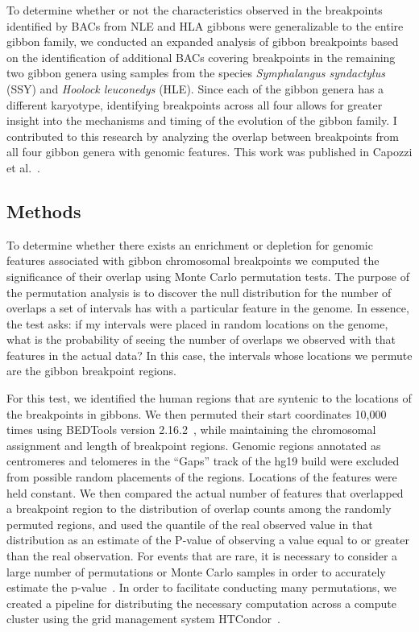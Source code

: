 To determine whether or not the characteristics observed in the breakpoints identified by BACs from NLE and HLA gibbons were generalizable to the entire gibbon family, we conducted an expanded analysis of gibbon breakpoints based on the identification of additional BACs covering breakpoints in the remaining two gibbon genera using samples from the species \emph{Symphalangus syndactylus} (SSY) and \emph{Hoolock leuconedys} (HLE). Since each of the gibbon genera has a different karyotype, identifying breakpoints across all four allows for greater insight into the mechanisms and timing of the evolution of the gibbon family. I contributed to this research by analyzing the overlap between breakpoints from all four gibbon genera with genomic features. This work was published in Capozzi et al.~\cite{Capozzi:2012bb}.

\subsection{Methods}

To determine whether there exists an enrichment or depletion for genomic features associated with gibbon chromosomal breakpoints we computed the significance of their overlap using Monte Carlo permutation tests. The purpose of the permutation analysis is to discover the null distribution for the number of overlaps a set of intervals has with a particular feature in the genome. In essence, the test asks: if my intervals were placed in random locations on the genome, what is the probability of seeing the number of overlaps we observed with that features in the actual data? In this case, the intervals whose locations we permute are the gibbon breakpoint regions.

For this test, we identified the human regions that are syntenic to the locations of the breakpoints in gibbons. We then permuted their start coordinates 10,000 times using BEDTools version 2.16.2~\cite{Quinlan:2010km}, while maintaining the chromosomal assignment and length of breakpoint regions. Genomic regions annotated as centromeres and telomeres in the ``Gaps'' track of the hg19 build were excluded from possible random placements of the regions. Locations of the features were held constant. We then compared the actual number of features that overlapped a breakpoint region to the distribution of overlap counts among the randomly permuted regions, and used the quantile of the real observed value in that distribution as an estimate of the P-value of observing a value equal to or greater than the real observation. For events that are rare, it is necessary to consider a large number of permutations or Monte Carlo samples in order to accurately estimate the p-value~\cite{Rubinstein:2007:SMC:1349778}. In order to facilitate conducting many permutations, we created a pipeline for distributing the necessary computation across a compute cluster using the grid management system HTCondor~\cite{condor-practice}.

